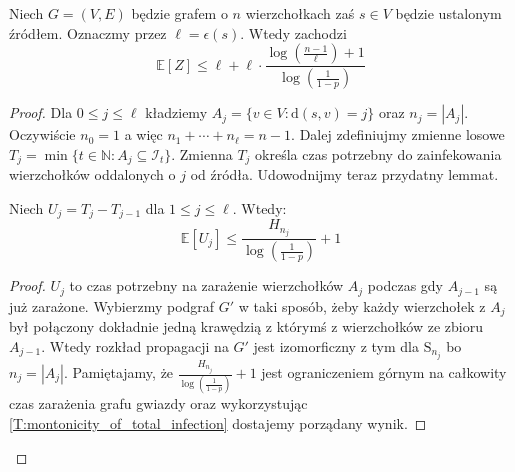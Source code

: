 \begin{theorem}\label{T:upper_bound_on_EZ}
Niech $G=(V,E)$ będzie grafem o $n$ wierzchołkach zaś $s\in V$ będzie ustalonym źródłem. Oznaczmy przez $\ell = \epsilon(s)$. Wtedy zachodzi
\[
    \mathbb{E}[Z] \le \ell  + \ell \cdot \frac{\log(\frac{n-1}{\ell}) + 1}{\log(\frac{1}{1-p})}
\]
\end{theorem}

\begin{proof}
Dla $0\le j \le \ell$ kładziemy $A_j = \{v \in V : \mathrm{d}(s,v) = j\}$ oraz $n_j= |A_j|$. Oczywiście $n_0=1$ a więc $n_1+\cdots+ n_\ell = n -1 $. Dalej zdefiniujmy zmienne losowe $T_j = \min\{t\in\mathbb{N} : A_j \subseteq \mathcal{I}_t\}$. Zmienna $T_j$ określa czas potrzebny do zainfekowania wierzchołków oddalonych o $j$ od źródła. Udowodnijmy teraz przydatny lemmat.

\begin{lemma}\label{L:helper_lemma}
Niech $U_j = T_j - T_{j-1}$ dla $1 \le j \le \ell$. Wtedy:
\[
    \mathbb{E}[U_j] \le \frac{H_{n_j}}{\log(\frac{1}{1-p})} + 1
\]
\end{lemma}
\begin{proof}
$U_j$ to czas potrzebny na zarażenie wierzchołków $A_j$ podczas gdy $A_{j-1}$ są już zarażone. Wybierzmy podgraf $G'$ w taki sposób, żeby każdy wierzchołek z $A_j$ był połączony dokładnie jedną krawędzią z którymś z wierzchołków ze zbioru $A_{j-1}$. Wtedy rozkład propagacji na $G'$ jest izomorficzny z tym dla $\mathrm{S}_{n_j}$ bo $n_j=|A_j|$. Pamiętajamy, że $\frac{H_{n_j}}{\log(\frac{1}{1-p})} + 1$ jest ograniczeniem górnym na całkowity czas zarażenia grafu gwiazdy oraz wykorzystując \cref{T:montonicity_of_total_infection} dostajemy porządany wynik.
\end{proof}


\end{proof}
